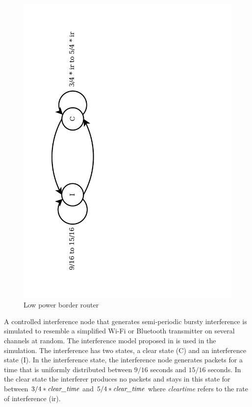 \begin{figure}
\centering
\includegraphics[trim=2cm 2cm 13cm 2cm, clip=true, totalheight=0.55\textheight, angle=270]{interferenceModel2.pdf}
\caption{Low power border router}
\label{fig_interferenceModel}
\end{figure}

A controlled interference node that generates semi-periodic bursty interference is simulated to resemble a simplified Wi-Fi or Bluetooth transmitter on several channels at random. The interference model proposed in \cite{interferenceModel} is used in the simulation. The interference has two states, a clear state (C) and an interference state (I). 
In the interference state, the interference node generates packets for a time that is uniformly distributed between $9/16$ seconds and $15/16$ seconds. In the clear state the interferer produces no packets and stays in this state for between $3/4 * \emph{clear\textunderscore time}$ and $5/4 * \emph{clear\textunderscore time}$ where \emph{clear\textunderscore time} refers to the rate of interference (ir). 


